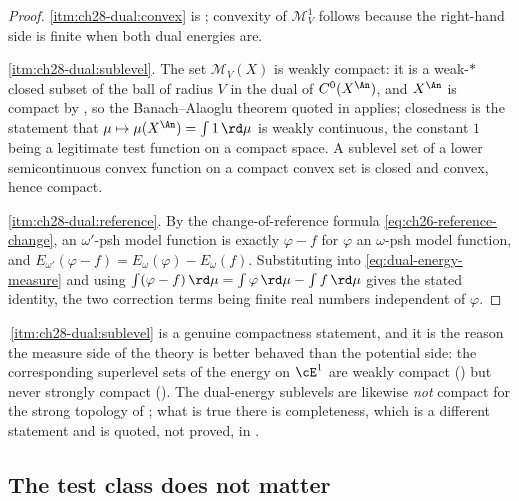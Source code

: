 \begin{proof}
\cref{itm:ch28-dual:convex} is ; convexity
of \(\mathcal M^1_V\) follows because the right-hand side is finite when
both dual energies are.

\cref{itm:ch28-dual:sublevel}.  The set \(\mathcal M_V(X)\) is weakly compact:
it is a weak-\(*\) closed subset of the ball of radius \(V\) in the dual of
\(C^0(X^{\An})\), and \(X^{\An}\) is compact by
, so the Banach--Alaoglu theorem quoted
in  applies; closedness is the statement that
\(\mu\mapsto\mu(X^{\An})=\int 1\,\rd\mu\) is weakly continuous, the constant
\(1\) being a legitimate test function on a compact space.  A sublevel set of
a lower semicontinuous convex function on a compact convex set is closed and
convex, hence compact.

\cref{itm:ch28-dual:reference}.  By the change-of-reference formula
\eqref{eq:ch26-reference-change}, an \(\omega'\)-psh model function is
exactly \(\varphi-f\) for \(\varphi\) an \(\omega\)-psh model function, and
\(E_{\omega'}(\varphi-f)=E_\omega(\varphi)-E_\omega(f)\).  Substituting into
\eqref{eq:dual-energy-measure} and using
\(\int(\varphi-f)\,\rd\mu=\int\varphi\,\rd\mu-\int f\,\rd\mu\) gives the
stated identity, the two correction terms being finite real numbers
independent of \(\varphi\).
\end{proof}

\begin{remark}
\label{rem:ch28-weak-not-strong}
\,\cref{itm:ch28-dual:sublevel} is a genuine
compactness statement, and it is the reason the measure side of the theory
is better behaved than the potential side: the corresponding superlevel sets
of the energy on \(\cE^1\) are weakly compact
() but never strongly compact
().  The dual-energy sublevels are
likewise \emph{not} compact for the strong topology of
; what is true there is completeness, which is
a different statement and is quoted, not proved, in
.
\end{remark}

\subsection{The test class does not matter}
\label{sec:ch28-test-class}

